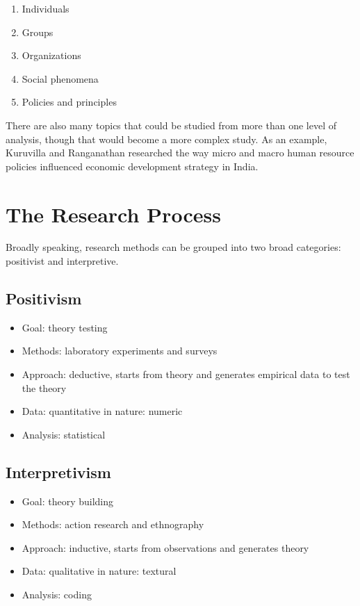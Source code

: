 \begin{enumerate}
	\item Individuals
	\item Groups
	\item Organizations
	\item Social phenomena
	\item Policies and principles
\end{enumerate}

There are also many topics that could be studied from more than one level of analysis, though that would become a more complex study. As an example, Kuruvilla and Ranganathan researched the way micro and macro human resource policies influenced economic development strategy in India\cite{kuruvilla2008economic}.
\section{The Research Process}\label{04:process}

Broadly speaking, research methods can be grouped into two broad categories: positivist and interpretive. 

\subsection{Positivism}

\begin{itemize}
	\item Goal: theory testing
	\item Methods: laboratory experiments and surveys
	\item Approach: deductive, starts from theory and generates empirical data to test the theory
	\item Data: quantitative in nature: numeric 
	\item Analysis: statistical
\end{itemize}

\subsection{Interpretivism}

\begin{itemize}
	\item Goal: theory building
	\item Methods: action research and ethnography
	\item Approach: inductive, starts from observations and generates theory
	\item Data: qualitative in nature: textural
	\item Analysis: coding
\end{itemize}

